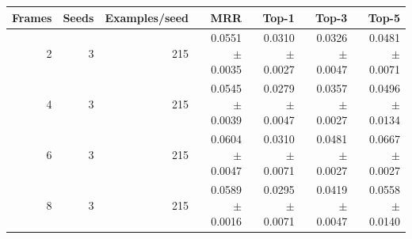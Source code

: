 \begin{tabular}{rrrrrrr}
Frames & Seeds & Examples/seed & MRR & Top-1 & Top-3 & Top-5 \\
\hline
2 & 3 & 215 & 0.0551 $\pm$ 0.0035 & 0.0310 $\pm$ 0.0027 & 0.0326 $\pm$ 0.0047 & 0.0481 $\pm$ 0.0071 \\
4 & 3 & 215 & 0.0545 $\pm$ 0.0039 & 0.0279 $\pm$ 0.0047 & 0.0357 $\pm$ 0.0027 & 0.0496 $\pm$ 0.0134 \\
6 & 3 & 215 & 0.0604 $\pm$ 0.0047 & 0.0310 $\pm$ 0.0071 & 0.0481 $\pm$ 0.0027 & 0.0667 $\pm$ 0.0027 \\
8 & 3 & 215 & 0.0589 $\pm$ 0.0016 & 0.0295 $\pm$ 0.0071 & 0.0419 $\pm$ 0.0047 & 0.0558 $\pm$ 0.0140 \\
\end{tabular}
